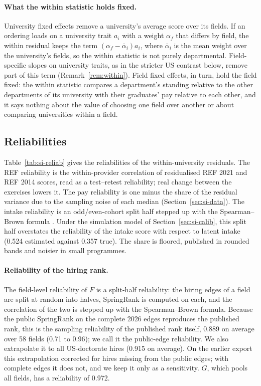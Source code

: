 \documentclass[11pt]{article}
\begin{document}
\paragraph{What the within statistic holds fixed.} University fixed effects remove a university's average score over
its fields. If an ordering loads on a university trait $a_i$ with a weight $\alpha_f$ that differs by field, the
within residual keeps the term $(\alpha_f-\bar\alpha_i)a_i$, where $\bar\alpha_i$ is the mean weight over the
university's fields, so the within statistic is not purely departmental. Field-specific slopes on university traits,
as in the stricter US contrast below, remove part of this term (Remark~\ref{rem:within}). Field fixed effects, in turn,
hold the field fixed: the within statistic compares a department's standing relative to the other departments of its
university with their graduates' pay relative to each other, and it says nothing about the value of choosing one
field over another or about comparing universities within a field.

\subsection{Reliabilities}

Table~\ref{tab:si-reliab} gives the reliabilities of the within-university residuals. The REF reliability is the
within-provider correlation of residualised REF 2021 and REF 2014 scores, read as a test--retest reliability; real
change between the exercises lowers it. The pay reliability is one minus the share of the residual variance due to
the sampling noise of each median (Section~\ref{sec:si-data}). The intake reliability is an odd/even-cohort split half
stepped up with the Spearman--Brown formula \citep{spearman1910correlation, brown1910some}. Under the simulation model
of Section~\ref{sec:si-calib}, this split half overstates the reliability of the intake score with respect to latent
intake (0.524 estimated against 0.357 true). The share is floored, published in rounded bands and noisier in small
programmes.

\paragraph{Reliability of the hiring rank.} The field-level reliability of $F$ is a split-half reliability: the hiring
edges of a field are split at random into halves, SpringRank is computed on each, and the correlation of the two is
stepped up with the Spearman--Brown formula. Because the public SpringRank on the complete 2026 edges
reproduces the published rank, this is the sampling reliability of the published rank itself, 0.889 on average over 58
fields (0.71 to 0.96); we call it the public-edge reliability. We also extrapolate it to all US-doctorate
hires (0.915 on average). On the earlier export this extrapolation corrected for hires missing from the public edges;
with complete edges it does not, and we keep it only as a sensitivity. $G$, which pools all fields, has a reliability
of 0.972.
\end{document}

